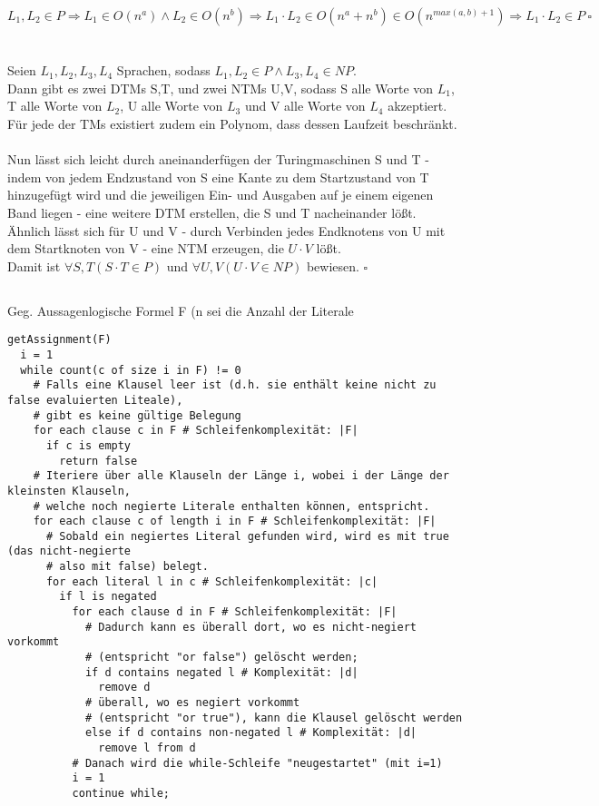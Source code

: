 \documentclass[fleqn]{article}
\begin{document}
\[
  L_1, L_2 \in P \Rightarrow L_1 \in O(n^a) \wedge L_2 \in O(n^b) \Rightarrow L_1 \cdot L_2 \in O(n^a + n^b) \in O(n^{max (a, b) + 1}) \Rightarrow L_1 \cdot L_2 \in P ~\square
\]\\
\\
Seien $L_1, L_2, L_3, L_4$ Sprachen, sodass $L_1, L_2 \in P \wedge L_3, L_4 \in NP$.\\
Dann gibt es zwei DTMs S,T, und zwei NTMs U,V, sodass S alle Worte von $L_1$, T alle Worte von $L_2$, U alle Worte von $L_3$ und V alle Worte von $L_4$ akzeptiert.\\
Für jede der TMs existiert zudem ein Polynom, dass dessen Laufzeit beschränkt.\\
\\
Nun lässt sich leicht durch aneinanderfügen der Turingmaschinen S und T - indem von jedem Endzustand von S eine Kante zu dem Startzustand von T hinzugefügt wird und die jeweiligen Ein- und Ausgaben auf je einem eigenen Band liegen - eine weitere DTM erstellen, die S und T nacheinander lößt.\\
Ähnlich lässt sich für U und V - durch Verbinden jedes Endknotens von U mit dem Startknoten von V - eine NTM erzeugen, die $U \cdot V$ lößt.\\
Damit ist $\forall S, T (S \cdot T \in P)$ und $\forall U, V (U \cdot V \in NP)$ bewiesen. $\square$

\newpage
\subsection{}%
Geg. Aussagenlogische Formel F (n sei die Anzahl der Literale
\begin{lstlisting}
getAssignment(F)
  i = 1
  while count(c of size i in F) != 0
    # Falls eine Klausel leer ist (d.h. sie enthält keine nicht zu false evaluierten Liteale),
    # gibt es keine gültige Belegung
    for each clause c in F # Schleifenkomplexität: |F|
      if c is empty
        return false
    # Iteriere über alle Klauseln der Länge i, wobei i der Länge der kleinsten Klauseln,
    # welche noch negierte Literale enthalten können, entspricht.
    for each clause c of length i in F # Schleifenkomplexität: |F|
      # Sobald ein negiertes Literal gefunden wird, wird es mit true (das nicht-negierte
      # also mit false) belegt.
      for each literal l in c # Schleifenkomplexität: |c|
        if l is negated
          for each clause d in F # Schleifenkomplexität: |F|
            # Dadurch kann es überall dort, wo es nicht-negiert vorkommt
            # (entspricht "or false") gelöscht werden;
            if d contains negated l # Komplexität: |d|
              remove d
            # überall, wo es negiert vorkommt
            # (entspricht "or true"), kann die Klausel gelöscht werden
            else if d contains non-negated l # Komplexität: |d|
              remove l from d
          # Danach wird die while-Schleife "neugestartet" (mit i=1)
          i = 1
          continue while;
    
\end{lstlisting}
\end{document}
